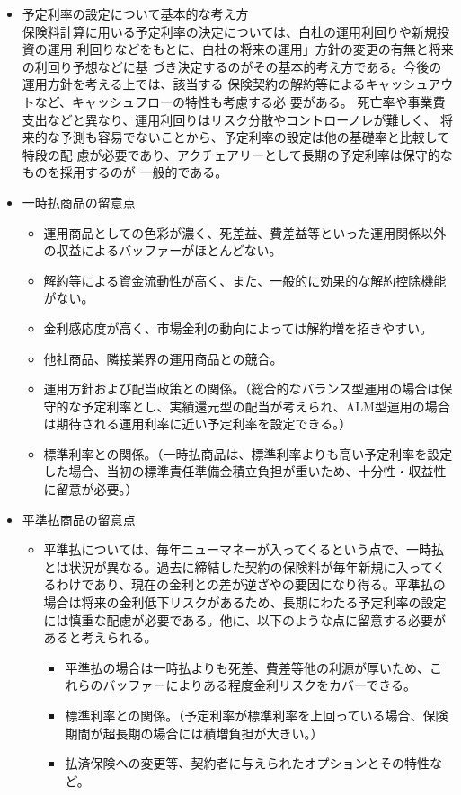 \documentclass[report,gutter=10mm,fore-edge=10mm,uplatex,dvipdfmx]{jlreq}
\begin{document}
\begin{itemize}
\tightlist
\item
  予定利率の設定について基本的な考え方\\

保険料計算に用いる予定利率の決定については、白杜の運用利回りや新規投資の運用
利回りなどをもとに、白杜の将来の運用」方針の変更の有無と将来の利回り予想などに基
づき決定するのがその基本的考え方である。今後の運用方針を考える上では、該当する
保険契約の解約等によるキャッシュアウトなど、キャッシュフローの特性も考慮する必
要がある。
死亡率や事業費支出などと異なり、運用利回りはリスク分散やコントローノレが難しく、
将来的な予測も容易でないことから、予定利率の設定は他の基礎率と比較して特段の配
慮が必要であり、アクチェアリーとして長期の予定利率は保守的なものを採用するのが
一般的である。

\item
  一時払商品の留意点

  \begin{itemize}
  \tightlist
  \item
    運用商品としての色彩が濃く、死差益、費差益等といった運用関係以外の収益によるバッファーがほとんどない。
  \item
    解約等による資金流動性が高く、また、一般的に効果的な解約控除機能がない。
  \item
    金利感応度が高く、市場金利の動向によっては解約増を招きやすい。
  \item
    他社商品、隣接業界の運用商品との競合。
  \item
    運用方針および配当政策との関係。（総合的なバランス型運用の場合は保守的な予定利率とし、実績還元型の配当が考えられ、ALM型運用の場合は期待される運用利率に近い予定利率を設定できる。）
  \item
    標準利率との関係。（一時払商品は、標準利率よりも高い予定利率を設定した場合、当初の標準責任準備金積立負担が重いため、十分性・収益性に留意が必要。）
  \end{itemize}
\item
  平準払商品の留意点

  \begin{itemize}
  \tightlist
  \item
    平準払については、毎年ニューマネーが入ってくるという点で、一時払とは状況が異なる。過去に締結した契約の保険料が毎年新規に入ってくるわけであり、現在の金利との差が逆ざやの要因になり得る。平準払の場合は将来の金利低下リスクがあるため、長期にわたる予定利率の設定には慎重な配慮が必要である。他に、以下のような点に留意する必要があると考えられる。

    \begin{itemize}
    \tightlist
    \item
      平準払の場合は一時払よりも死差、費差等他の利源が厚いため、これらのバッファーによりある程度金利リスクをカバーできる。
    \item
      標準利率との関係。（予定利率が標準利率を上回っている場合、保険期間が超長期の場合には積増負担が大きい。）
    \item
      払済保険への変更等、契約者に与えられたオプションとその特性など。
    \end{itemize}
  \end{itemize}
\end{itemize}
\end{document}

